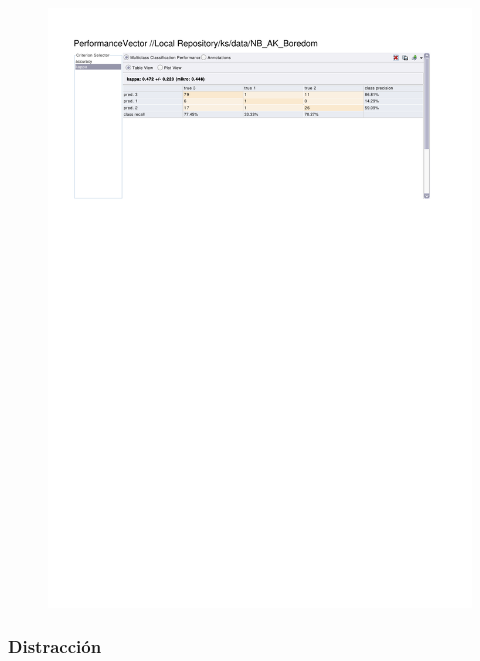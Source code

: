 \begin{figure}[htp]
  \centerline{\includegraphics[trim=0 680 0 60,clip,width=16.09cm]{results/NB_K_Boredom.pdf}} \caption{
} \label{NB_K_Boredom}
\end{figure}

\clearpage
\FloatBarrier
\subsubsection{Distracción}

